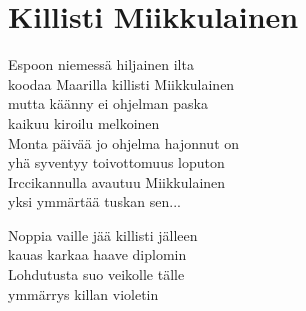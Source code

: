\section{Killisti Miikkulainen}

Espoon niemessä hiljainen ilta\\
koodaa Maarilla killisti Miikkulainen\\
mutta käänny ei ohjelman paska\\
kaikuu kiroilu melkoinen\\

Monta päivää jo ohjelma hajonnut on\\
yhä syventyy toivottomuus loputon\\
Irccikannulla avautuu Miikkulainen\\
yksi ymmärtää tuskan sen...

Noppia vaille jää killisti jälleen\\
kauas karkaa haave diplomin\\
Lohdutusta suo veikolle tälle\\
ymmärrys killan violetin
